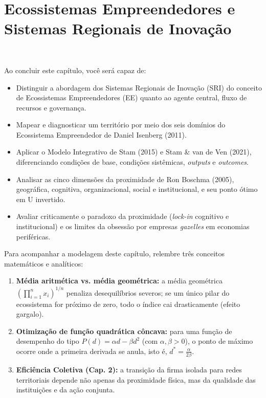 \chapter{Ecossistemas Empreendedores e Sistemas Regionais de Inovação}
\ \tagTerritorio

\begin{capObjetivos}
Ao concluir este capítulo, você será capaz de:
\begin{itemize}[leftmargin=1.4em, itemsep=2pt]
  \item Distinguir a abordagem dos Sistemas Regionais de Inovação (SRI) do conceito de Ecossistemas Empreendedores (EE) quanto ao agente central, fluxo de recursos e governança.
  \item Mapear e diagnosticar um território por meio dos seis domínios do Ecossistema Empreendedor de Daniel Isenberg (2011).
  \item Aplicar o Modelo Integrativo de Stam (2015) e Stam \& van de Ven (2021), diferenciando condições de base, condições sistêmicas, \textit{outputs} e \textit{outcomes}.
  \item Analisar as cinco dimensões da proximidade de Ron Boschma (2005), geográfica, cognitiva, organizacional, social e institucional, e seu ponto ótimo em U invertido.
  \item Avaliar criticamente o paradoxo da proximidade (\textit{lock-in} cognitivo e institucional) e os limites da obsessão por empresas \textit{gazelles} em economias periféricas.
\end{itemize}
\end{capObjetivos}

\begin{capRevisao}
Para acompanhar a modelagem deste capítulo, relembre três conceitos matemáticos e analíticos:
\begin{enumerate}[leftmargin=1.4em, itemsep=2pt]
  \item \textbf{Média aritmética vs. média geométrica:} a média geométrica $\left(\prod_{i=1}^n x_i\right)^{1/n}$ penaliza desequilíbrios severos; se um único pilar do ecossistema for próximo de zero, todo o índice cai drasticamente (efeito gargalo).
  \item \textbf{Otimização de função quadrática côncava:} para uma função de desempenho do tipo $P(d) = \alpha d - \beta d^2$ (com $\alpha, \beta > 0$), o ponto de máximo ocorre onde a primeira derivada se anula, isto é, $d^* = \frac{\alpha}{2\beta}$.
  \item \textbf{Eficiência Coletiva (Cap. 2):} a transição da firma isolada para redes territoriais depende não apenas da proximidade física, mas da qualidade das instituições e da ação conjunta.
\end{enumerate}
\end{capRevisao}

